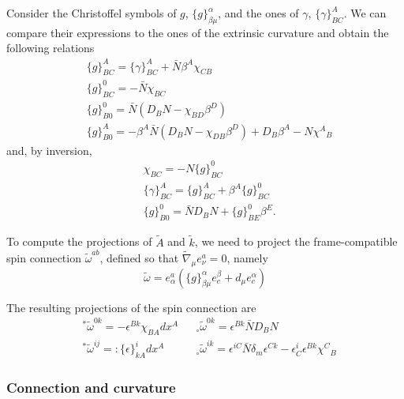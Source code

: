 \documentclass[a4paper, 11pt]{article}
\def\al{\alpha}
\def\be{\beta}
\def\ga{\gamma}
\def\de{\delta}
\def\ep{\epsilon}
\def\om{\omega}
\def\na{\nabla}
\def\tp#1{{}^\ast\!#1}
\def\np#1{{}_\circ#1}
\def\chr#1#2#3#4{\{#1\}^#2_{#3 #4}}
\numberwithin{equation}{section}
\begin{document}
Consider the Christoffel symbols of $g$, $\chr g \al\be\mu$, and the ones of $\ga$, $\chr \ga AB C$. We can compare their expressions to the ones of the extrinsic curvature and obtain the following relations
\begin{subequations}
\begin{align}
        &\chr g ABC = \chr \ga ABC + \bar N \be^A \chi_{CB} \\ 
        &\chr g 0BC = - \bar N \chi_{BC}      \\
        &\chr g 0B0 = \bar N \left(D_B N - \chi_{BD}\be^D\right)\\ 
        &\chr g AB0 = -\be^A \bar N (D_B N - \chi_{DB} \be^D) + D_B\be^A - N\chi^A{}_B
    \end{align}
\end{subequations}
and, by inversion, 
\begin{subequations}
    \begin{align}
        &\chi_{BC} = - N \chr g 0BC \\
        &\chr \ga ABC = \chr g ABC +  \be^A \chr g 0BC \\ 
        &\chr g 0B0 = \bar N D_B N + \chr g 0BE \be^E.
    \end{align}
    \label{eq:christoffel_extrinsic_curvature}
\end{subequations}

To compute the projections of $\tilde A$ and $\tilde k$, we need to project the frame-compatible spin connection $\tilde \om^{ab}$, defined so that $\tilde\na_\mu e^a_\nu = 0$, namely 
\begin{equation}
    \tilde \om  = e^a_\al \left(\chr g \al\be\mu e^\be_c + d_\mu e^\al_c\right)
\end{equation} 

The resulting projections of the spin connection are
\begin{subequations}
    \begin{align}
        &\tp\tilde\om^{0k} = -\ep^{Bk}\chi_{BA} dx^A && \np \tilde\om^{0k} = \ep^{Bk}\bar N D_B N \\ 
        &\tp\tilde\om^{ij} =: \chr\ep ikA dx^A && \np \tilde\om^{ik} = \ep^{iC}\bar N\de_m \ep^{Ck} - \ep^i_C\ep^{Bk}\chi^{C}{}_{B} 
    \end{align}
    \label{eq:projections_spin_connection}
\end{subequations} 



\subsubsection{Connection and curvature }
\end{document}
